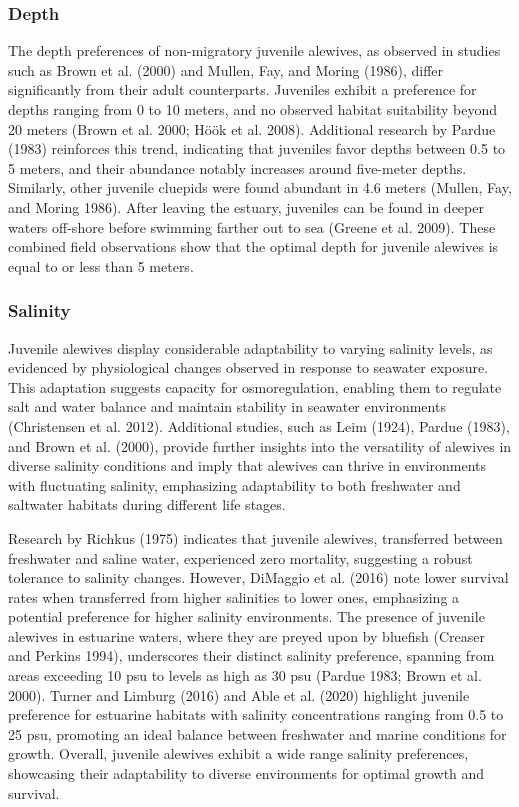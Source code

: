 \documentclass[
]{book}
\begin{document}
\hypertarget{depth-1}{%
\subsubsection{Depth}\label{depth-1}}

The depth preferences of non-migratory juvenile alewives, as observed in studies such as Brown et al. (2000) and Mullen, Fay, and Moring (1986), differ significantly from their adult counterparts. Juveniles exhibit a preference for depths ranging from 0 to 10 meters, and no observed habitat suitability beyond 20 meters (Brown et al. 2000; Höök et al. 2008). Additional research by Pardue (1983) reinforces this trend, indicating that juveniles favor depths between 0.5 to 5 meters, and their abundance notably increases around five-meter depths. Similarly, other juvenile cluepids were found abundant in 4.6 meters (Mullen, Fay, and Moring 1986). After leaving the estuary, juveniles can be found in deeper waters off-shore before swimming farther out to sea (Greene et al. 2009). These combined field observations show that the optimal depth for juvenile alewives is equal to or less than 5 meters.

\hypertarget{salinity-1}{%
\subsubsection{Salinity}\label{salinity-1}}

Juvenile alewives display considerable adaptability to varying salinity levels, as evidenced by physiological changes observed in response to seawater exposure. This adaptation suggests capacity for osmoregulation, enabling them to regulate salt and water balance and maintain stability in seawater environments (Christensen et al. 2012). Additional studies, such as Leim (1924), Pardue (1983), and Brown et al. (2000), provide further insights into the versatility of alewives in diverse salinity conditions and imply that alewives can thrive in environments with fluctuating salinity, emphasizing adaptability to both freshwater and saltwater habitats during different life stages.

Research by Richkus (1975) indicates that juvenile alewives, transferred between freshwater and saline water, experienced zero mortality, suggesting a robust tolerance to salinity changes. However, DiMaggio et al. (2016) note lower survival rates when transferred from higher salinities to lower ones, emphasizing a potential preference for higher salinity environments. The presence of juvenile alewives in estuarine waters, where they are preyed upon by bluefish (Creaser and Perkins 1994), underscores their distinct salinity preference, spanning from areas exceeding 10 psu to levels as high as 30 psu (Pardue 1983; Brown et al. 2000). Turner and Limburg (2016) and Able et al. (2020) highlight juvenile preference for estuarine habitats with salinity concentrations ranging from 0.5 to 25 psu, promoting an ideal balance between freshwater and marine conditions for growth. Overall, juvenile alewives exhibit a wide range salinity preferences, showcasing their adaptability to diverse environments for optimal growth and survival.
\end{document}
